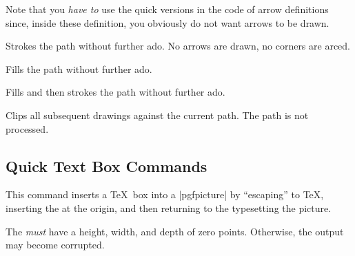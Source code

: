 Note that you \emph{have to} use the quick versions in the code of
arrow definitions since, inside these definition, you obviously do not
want arrows to be drawn.

\begin{command}{\pgfusepathqstroke}
  Strokes the path without further ado. No arrows are drawn, no
  corners are arced.

\begin{codeexample}[]
\begin{pgfpicture}
  \pgfpathqcircle{5pt}
  \pgfusepathqstroke
\end{pgfpicture}
\end{codeexample}
\end{command}

\begin{command}{\pgfusepathqfill}
  Fills the path without further ado.
\end{command}

\begin{command}{\pgfusepathqfillstroke}
  Fills and then strokes the path without further ado.
\end{command}

\begin{command}{\pgfusepathqclip}
  Clips all subsequent drawings against the current path. The path is
  not processed.
\end{command}


\subsection{Quick Text Box Commands}

\begin{command}{\pgfqbox{}}
  This command inserts a \TeX\ box into a |{pgfpicture}| by
  ``escaping'' to \TeX, inserting the  at the origin, and
  then returning to the typesetting the picture.

  The  \emph{must} have a height, width, and depth of zero
  points. Otherwise, the output may become corrupted.
\end{command}
